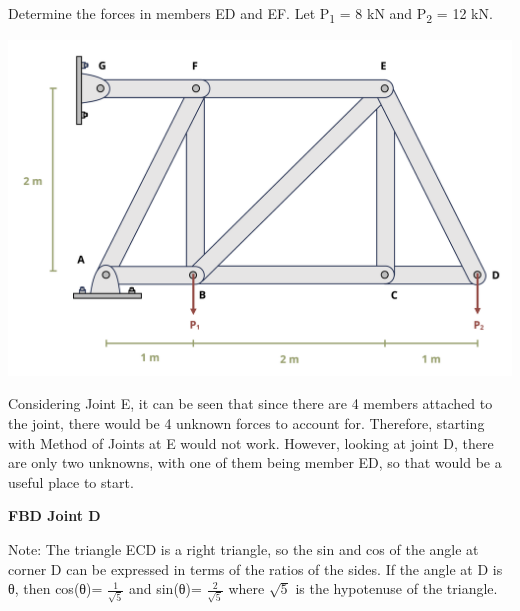 \documentclass[
  letterpaper,
  DIV=11,
  numbers=noendperiod]{scrreprt}
\begin{document}
\begin{tcolorbox}[enhanced jigsaw, breakable, opacityback=0, toptitle=1mm, left=2mm, colback=white, opacitybacktitle=0.6, colframe=quarto-callout-tip-color-frame, titlerule=0mm, arc=.35mm, leftrule=.75mm, bottomtitle=1mm, colbacktitle=quarto-callout-tip-color!10!white, rightrule=.15mm, title={Example 1.4}, bottomrule=.15mm, toprule=.15mm, coltitle=black]

Determine the forces in members ED and EF. Let P\textsubscript{1} = 8 kN
and P\textsubscript{2} = 12 kN.

\begin{center}
\includegraphics{images/CH1 PNGs/example 1.4 part 1.png}
\end{center}

\begin{tcolorbox}[enhanced jigsaw, breakable, opacityback=0, toptitle=1mm, left=2mm, colback=white, opacitybacktitle=0.6, colframe=quarto-callout-tip-color-frame, titlerule=0mm, arc=.35mm, leftrule=.75mm, bottomtitle=1mm, colbacktitle=quarto-callout-tip-color!10!white, rightrule=.15mm, title={Solution - Method of Joints}, bottomrule=.15mm, toprule=.15mm, coltitle=black]

Considering Joint E, it can be seen that since there are 4 members
attached to the joint, there would be 4 unknown forces to account for.
Therefore, starting with Method of Joints at E would not work. However,
looking at joint D, there are only two unknowns, with one of them being
member ED, so that would be a useful place to start.

\textbf{FBD Joint D}

Note: The triangle ECD is a right triangle, so the sin and cos of the
angle at corner D can be expressed in terms of the ratios of the sides.
If the angle at D is θ, then cos(θ)= \(\frac{1}{\sqrt{5}}\) and sin(θ)=
\(\frac{2}{\sqrt{5}}\) where \(\sqrt{5}\) is the hypotenuse of the
triangle.


\end{tcolorbox}
\end{tcolorbox}
\end{document}
